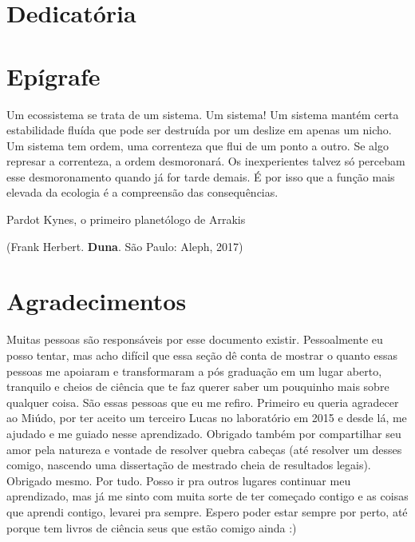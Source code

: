 \documentclass[a4paper, 12pt]{article}
\begin{document}
\section*{Dedicatória}
 \thispagestyle{plain}
{\raggedleft\vfill\itshape{}\par
}
\newpage

\section*{Epígrafe}
\thispagestyle{plain}
\vfill
 
Um ecossistema se trata de um sistema. Um sistema!
Um sistema mantém certa estabilidade fluída que pode ser destruída por um deslize em apenas um nicho.
Um sistema tem ordem, uma correnteza que flui de um ponto a outro.
Se algo represar a correnteza, a ordem desmoronará.
Os inexperientes talvez só percebam esse desmoronamento quando já for tarde demais.
É por isso que a função mais elevada da ecologia é a compreensão das consequências.

\begin{flushright}
Pardot Kynes, o primeiro planetólogo de Arrakis

(Frank Herbert. \textbf{Duna}. São Paulo: Aleph, 2017)
\end{flushright}
\newpage

\section*{Agradecimentos}
 \thispagestyle{plain}
Muitas pessoas são responsáveis por esse documento existir. Pessoalmente eu posso tentar, mas acho difícil que essa seção dê conta de mostrar o quanto essas pessoas me apoiaram e transformaram a pós graduação em um lugar aberto, tranquilo e cheios de ciência que te faz querer saber um pouquinho mais sobre qualquer coisa. São essas pessoas que eu me refiro. Primeiro eu queria agradecer ao Miúdo, por ter aceito um terceiro Lucas no laboratório em 2015 e desde lá, me ajudado e me guiado nesse aprendizado. Obrigado também por compartilhar seu amor pela natureza e vontade de resolver quebra cabeças (até resolver um desses comigo, nascendo uma dissertação de mestrado cheia de resultados legais). Obrigado mesmo. Por tudo. Posso ir pra outros lugares continuar meu aprendizado, mas já me sinto com muita sorte de ter começado contigo e as coisas que aprendi contigo, levarei pra sempre. Espero poder estar sempre por perto, até porque tem livros de ciência seus que estão comigo ainda :)
\end{document}
